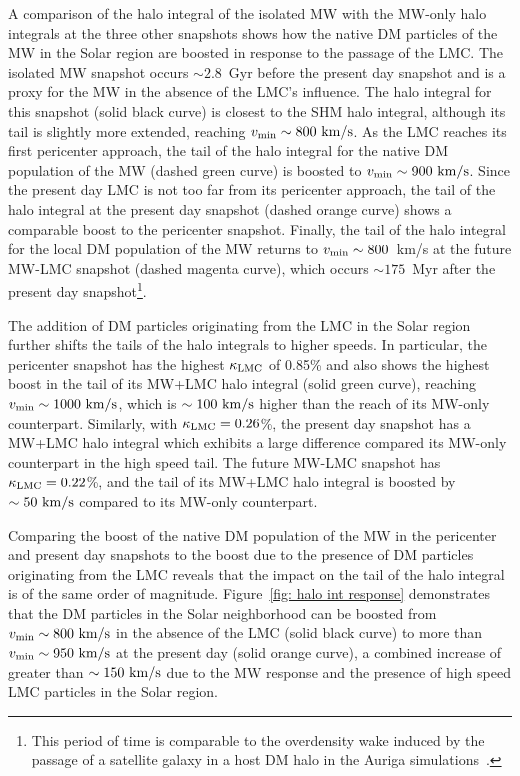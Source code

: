 A comparison of the halo integral of the isolated MW  with  the MW-only halo integrals at the three other snapshots  shows how the native DM particles of the MW in the Solar region are boosted in response to the passage of the LMC. The isolated MW snapshot occurs $\sim 2.8$~Gyr before the present day snapshot and is a proxy for the  MW in the absence of the LMC's influence. The halo integral for this snapshot (solid black curve) is closest to the SHM halo integral, although its tail is slightly more extended, reaching $v_{\rm min} \sim 800~\rm{km/s}$. As the LMC reaches its first pericenter approach, the tail of the halo integral for the native DM population of the MW (dashed green curve) is boosted to $v_{\rm min} \sim 900~\rm{km/s}$. Since the present day LMC is not too far from its pericenter approach, the tail of the halo integral at the present day snapshot (dashed orange curve) shows a comparable boost to the pericenter snapshot. 
Finally, the tail of the halo integral for the local DM population of the MW returns to $v_{\rm min}  \sim 800$~km/s at the future MW-LMC snapshot (dashed magenta curve), which occurs $\sim 175$~Myr after the present day snapshot\footnote{This period of time is comparable to the overdensity wake induced by the passage of a satellite galaxy in a host DM halo in the Auriga simulations~\cite{Gomez2016}.}. 



The addition of DM particles originating from the LMC in the Solar region further shifts the tails of the halo integrals to higher speeds.
In particular, the pericenter snapshot has the highest  $\kappa_{\rm LMC}$ of 0.85\% and also shows the highest boost in the tail of its MW+LMC halo integral (solid green curve), reaching $v_{\rm min} \sim 1000~\rm{km/s}$, which is $\sim100~\rm{km/s}$ higher than the reach of its MW-only counterpart. Similarly, with $\kappa_{\rm LMC}=0.26$\%, the present day snapshot has a  MW+LMC halo integral which exhibits a large difference compared its MW-only counterpart in the high speed tail. The future MW-LMC snapshot 
has $\kappa_{\rm LMC}=0.22$\%, and the tail of its  MW+LMC halo integral is boosted by $\sim50~\rm{km/s}$ compared to its MW-only counterpart. 

Comparing the boost of the native DM population of the MW in the pericenter and present day snapshots to the boost due to the presence of DM particles originating from the LMC reveals that the impact on the tail of the halo integral is of the same order of magnitude. 
Figure~\ref{fig: halo int response} demonstrates that the DM particles in the Solar neighborhood can be boosted from  $v_{\rm min} \sim 800~\rm{km/s}$ in the absence of the LMC (solid black curve) to more than $v_{\rm min} \sim 950~\rm{km/s}$ at the present day (solid orange curve), a combined increase of greater than $\sim 150~\rm{km/s}$ due to the MW response and the presence of high speed LMC particles in the Solar region. 





